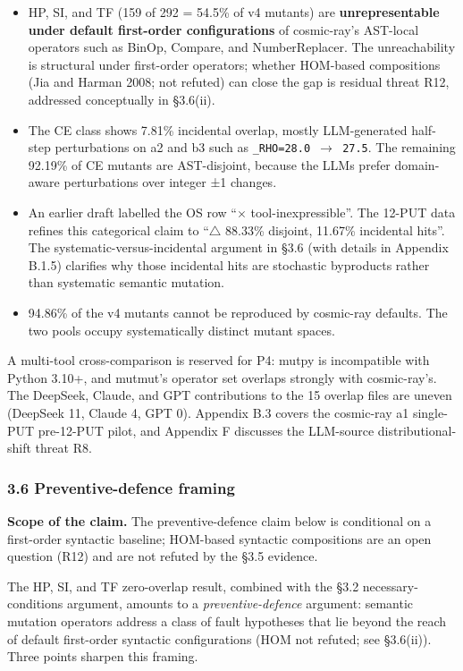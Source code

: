 \documentclass[review,12pt,authoryear]{elsarticle}
\providecommand{\tightlist}{\setlength{\itemsep}{0pt}\setlength{\parskip}{0pt}}
\begin{document}
\begin{itemize}
\tightlist
\item
  HP, SI, and TF (159 of 292 = 54.5\% of v4 mutants) are
  \textbf{unrepresentable under default first-order configurations} of
  cosmic-ray's AST-local operators such as BinOp, Compare, and
  NumberReplacer. The unreachability is structural under first-order
  operators; whether HOM-based compositions (Jia and Harman 2008; not
  refuted) can close the gap is residual threat R12, addressed
  conceptually in §3.6(ii).
\item
  The CE class shows 7.81\% incidental overlap, mostly LLM-generated
  half-step perturbations on a2 and b3 such as
  \texttt{\_RHO=28.0\ $\to$\ 27.5}. The remaining 92.19\% of CE mutants are
  AST-disjoint, because the LLMs prefer domain-aware perturbations over
  integer ±1 changes.
\item
  An earlier draft labelled the OS row ``$\times$ tool-inexpressible''. The
  12-PUT data refines this categorical claim to ``$\bigtriangleup$ 88.33\% disjoint,
  11.67\% incidental hits''. The systematic-versus-incidental argument
  in §3.6 (with details in Appendix B.1.5) clarifies why those
  incidental hits are stochastic byproducts rather than systematic
  semantic mutation.
\item
  94.86\% of the v4 mutants cannot be reproduced by cosmic-ray defaults.
  The two pools occupy systematically distinct mutant spaces.
\end{itemize}

A multi-tool cross-comparison is reserved for P4: mutpy is incompatible
with Python 3.10+, and mutmut's operator set overlaps strongly with
cosmic-ray's. The DeepSeek, Claude, and GPT contributions to the 15
overlap files are uneven (DeepSeek 11, Claude 4, GPT 0). Appendix B.3
covers the cosmic-ray a1 single-PUT pre-12-PUT pilot, and Appendix F
discusses the LLM-source distributional-shift threat R8.

\subsubsection{3.6 Preventive-defence
framing}\label{preventive-defence-framing}

\textbf{Scope of the claim.} The preventive-defence claim below is
conditional on a first-order syntactic baseline; HOM-based syntactic
compositions are an open question (R12) and are not refuted by the §3.5
evidence.

The HP, SI, and TF zero-overlap result, combined with the §3.2
necessary-conditions argument, amounts to a \emph{preventive-defence}
argument: semantic mutation operators address a class of fault
hypotheses that lie beyond the reach of default first-order syntactic
configurations (HOM not refuted; see §3.6(ii)). Three points sharpen
this framing.
\end{document}
